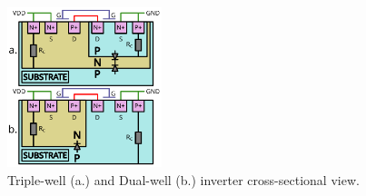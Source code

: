 
\begin{figure}[h]
	\centering
	\includegraphics[width=0.4\textwidth]{./figures/substrate_2.pdf}
	\caption{Triple-well (a.) and Dual-well (b.) inverter cross-sectional view.}
	\label{fig_sub}
\end{figure}
